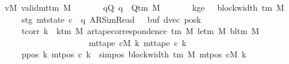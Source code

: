 \begin{isabellebody}
\ \ \ vM{\isacharcolon}{\kern0pt}\ {\isachardoublequoteopen}valid{\isacharunderscore}{\kern0pt}mttm\ M{\isachardoublequoteclose}\isanewline
\ \ \ \ \ \ \ qQ{\isacharcolon}{\kern0pt}\ {\isachardoublequoteopen}q\ {\isasymin}\ Q{\isacharunderscore}{\kern0pt}tm\ M{\isachardoublequoteclose}\isanewline
\ \ \ \ \ \ \ kge{}{\isacharcolon}{\kern0pt}\ {\isachardoublequoteopen}{}\ {\isasymle}\ block{\isacharunderscore}{\kern0pt}width\ {\isacharparenleft}{\kern0pt}{\isasymGamma}{\isacharunderscore}{\kern0pt}tm\ M{\isacharparenright}{\kern0pt}{\isachardoublequoteclose}\isanewline
\ \ \ \ \ \ \ stg{}{\isacharcolon}{\kern0pt}\ {\isachardoublequoteopen}mt{\isacharunderscore}{\kern0pt}state\ c{}\ {\isacharequal}{\kern0pt}\ {\isacharparenleft}{\kern0pt}q{\isacharcomma}{\kern0pt}\ AR{\isacharunderscore}{\kern0pt}SimRead{\isacharcomma}{\kern0pt}\ {}{\isacharcomma}{\kern0pt}\ {}{\isacharcomma}{\kern0pt}\ buf{}{\isacharcomma}{\kern0pt}\ dvec{\isacharcomma}{\kern0pt}\ posk{}{\isacharparenright}{\kern0pt}{\isachardoublequoteclose}\isanewline
\ \ \ \ \ \ \ tcorr{\isacharcolon}{\kern0pt}\ {\isachardoublequoteopen}{\isasymforall}k\ {\isacharless}{\kern0pt}\ k{\isacharunderscore}{\kern0pt}tm\ M{\isachardot}{\kern0pt}\ ar{\isacharunderscore}{\kern0pt}tape{\isacharunderscore}{\kern0pt}correspondence\ {\isacharparenleft}{\kern0pt}{\isasymGamma}{\isacharunderscore}{\kern0pt}tm\ M{\isacharparenright}{\kern0pt}\ {\isacharparenleft}{\kern0pt}le{\isacharunderscore}{\kern0pt}tm\ M{\isacharparenright}{\kern0pt}\ {\isacharparenleft}{\kern0pt}bl{\isacharunderscore}{\kern0pt}tm\ M{\isacharparenright}{\kern0pt}\isanewline
\ \ \ \ \ \ \ \ \ \ \ \ \ \ \ \ \ \ \ \ \ \ \ {\isacharparenleft}{\kern0pt}mt{\isacharunderscore}{\kern0pt}tape\ cM\ k{\isacharparenright}{\kern0pt}\ {\isacharparenleft}{\kern0pt}mt{\isacharunderscore}{\kern0pt}tape\ c{}\ k{\isacharparenright}{\kern0pt}{\isachardoublequoteclose}\isanewline
\ \ \ \ \ \ \ ppos{\isacharcolon}{\kern0pt}\ {\isachardoublequoteopen}{\isasymAnd}k{\isachardot}{\kern0pt}\ mt{\isacharunderscore}{\kern0pt}pos\ c{}\ k\ {\isacharequal}{\kern0pt}\ sim{\isacharunderscore}{\kern0pt}pos\ {\isacharparenleft}{\kern0pt}block{\isacharunderscore}{\kern0pt}width\ {\isacharparenleft}{\kern0pt}{\isasymGamma}{\isacharunderscore}{\kern0pt}tm\ M{\isacharparenright}{\kern0pt}{\isacharparenright}{\kern0pt}\ {\isacharparenleft}{\kern0pt}mt{\isacharunderscore}{\kern0pt}pos\ cM\ k{\isacharparenright}{\kern0pt}{\isachardoublequoteclose}\isanewline

\end{isabellebody}
